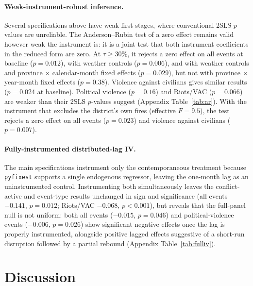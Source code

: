 \documentclass[12pt]{article}
\begin{document}
\paragraph{Weak-instrument-robust inference.} Several specifications above have weak first stages, where conventional 2SLS $p$-values are unreliable. The Anderson--Rubin test of a zero effect remains valid however weak the instrument is: it is a joint test that both instrument coefficients in the reduced form are zero. At $\tau \geq 30\%$, it rejects a zero effect on all events at baseline ($p=0.012$), with weather controls ($p=0.006$), and with weather controls and province $\times$ calendar-month fixed effects ($p=0.029$), but not with province $\times$ year-month fixed effects ($p=0.38$). Violence against civilians gives similar results ($p=0.024$ at baseline). Political violence ($p=0.16$) and Riots/VAC ($p=0.066$) are weaker than their 2SLS $p$-values suggest (Appendix Table~\ref{tab:ar}). With the instrument that excludes the district's own fires (effective $F = 9.5$), the test rejects a zero effect on all events ($p=0.023$) and violence against civilians ($p=0.007$).

\paragraph{Fully-instrumented distributed-lag IV.} The main specifications instrument only the contemporaneous treatment because \texttt{pyfixest} supports a single endogenous regressor, leaving the one-month lag as an uninstrumented control. Instrumenting both simultaneously leaves the conflict-active and event-type results unchanged in sign and significance (all events $-0.141$, $p=0.012$; Riots/VAC $-0.068$, $p<0.001$), but reveals that the full-panel null is not uniform: both all events ($-0.015$, $p=0.046$) and political-violence events ($-0.006$, $p=0.026$) show significant negative effects once the lag is properly instrumented, alongside positive lagged effects suggestive of a short-run disruption followed by a partial rebound (Appendix Table~\ref{tab:fulliv}).

\section{Discussion}
\label{sec:discussion}
\end{document}
